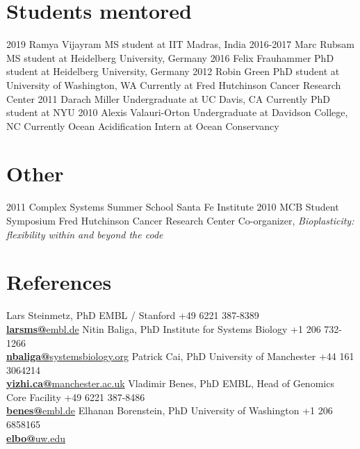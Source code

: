 \documentclass[usenames,dvipsnames]{friggeri-cv}
\begin{document}
\section{Students mentored}
\begin{entrylist}
  \entry
    {2019}
    {Ramya Vijayram}
    {MS student at IIT Madras, India}
    {}
   \entry
    {2016-2017}
    {Marc Rubsam}
    {MS student at Heidelberg University, Germany}
    {}
  \entry
    {2016}
    {Felix Frauhammer}
    {PhD student at Heidelberg University, Germany}
    {}
  \entry
    {2012}
    {Robin Green}
    {PhD student at University of Washington, WA}
    {Currently at Fred Hutchinson Cancer Research Center}
  \entry
    {2011}
    {Darach Miller}
    {Undergraduate at UC Davis, CA}
    {Currently PhD student at NYU}
  \entry
    {2010}
    {Alexis Valauri-Orton}
    {Undergraduate at Davidson College, NC}
    {Currently Ocean Acidification Intern at Ocean Conservancy}
\end{entrylist}

\section{Other}
\begin{entrylist}
 \entry
    {2011}
    {Complex Systems Summer School}
    {Santa Fe Institute}
    {}
  \entry
    {2010}
    {MCB Student Symposium}
    {Fred Hutchinson Cancer Research Center}
    {Co-organizer, \emph{Bioplasticity: flexibility within and beyond the code}}
\end{entrylist}

\section{References}
\begin{entrylist}
\entry
    {}
    {Lars Steinmetz, PhD}
    {EMBL / Stanford}
    {+49 6221 387-8389\\
    \href{mailto:larsms@embl.de}{\textbf{larsms@}embl.de}}
    \entry
    {}
    {Nitin Baliga, PhD}
    {Institute for Systems Biology}
    {+1 206 732-1266\\
    \href{mailto:nbaliga@systemsbiology.org}{\textbf{nbaliga@}systemsbiology.org}}
     \entry
    {}
    {Patrick Cai, PhD}
    {University of Manchester}
    {+44 161 3064214\\
    \href{mailto:yizhi.ca@manchester.ac.uk}{\textbf{yizhi.ca@}manchester.ac.uk}}
     \entry
    {}
    {Vladimir Benes, PhD}
    {EMBL, Head of Genomics Core Facility}
    {+49 6221 387-8486\\
    \href{mailto:benes@embl.de}{\textbf{benes@}embl.de}}
     \entry
    {}
    {Elhanan Borenstein, PhD}
    {University of Washington}
    {+1 206 6858165\\
    \href{mailto:elbo@uw.edu}{\textbf{elbo@}uw.edu}}
\end{entrylist}
\end{document}
